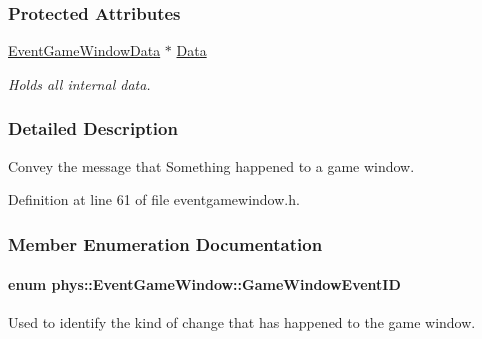 \subsubsection*{Protected Attributes}
\begin{DoxyCompactItemize}
\item 
\hypertarget{classphys_1_1EventGameWindow_aa5ceefae0b4ef7a017425cbd3ee08600}{
\hyperlink{classphys_1_1EventGameWindowData}{EventGameWindowData} $\ast$ \hyperlink{classphys_1_1EventGameWindow_aa5ceefae0b4ef7a017425cbd3ee08600}{Data}}
\label{d4/d0f/classphys_1_1EventGameWindow_aa5ceefae0b4ef7a017425cbd3ee08600}

\begin{DoxyCompactList}\small\item\em Holds all internal data. \item\end{DoxyCompactList}\end{DoxyCompactItemize}


\subsubsection{Detailed Description}
Convey the message that Something happened to a game window. 

Definition at line 61 of file eventgamewindow.h.



\subsubsection{Member Enumeration Documentation}
\hypertarget{classphys_1_1EventGameWindow_a45225255070513d3cff88cdfea25cc09}{
\paragraph[{GameWindowEventID}]{\setlength{\rightskip}{0pt plus 5cm}enum {\bf phys::EventGameWindow::GameWindowEventID}}\hfill}
\label{d4/d0f/classphys_1_1EventGameWindow_a45225255070513d3cff88cdfea25cc09}


Used to identify the kind of change that has happened to the game window. 

